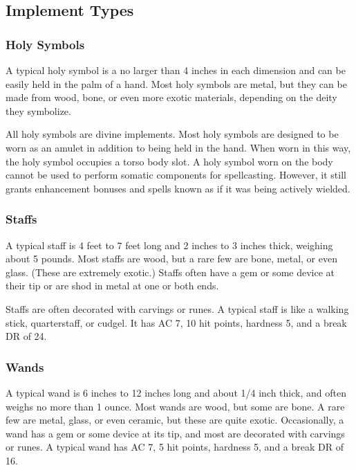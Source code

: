     \subsection{Implement Types}

        \subsubsection{Holy Symbols}

             A typical holy symbol is a no larger than 4 inches in each dimension and can be easily held in the palm of a hand.
            Most holy symbols are metal, but they can be made from wood, bone, or even more exotic materials, depending on the deity they symbolize.

             All holy symbols are divine implements.
            Most holy symbols are designed to be worn as an amulet in addition to being held in the hand.
            When worn in this way, the holy symbol occupies a torso body slot.
            A holy symbol worn on the body cannot be used to perform somatic components for spellcasting.
            However, it still grants enhancement bonuses and spells known as if it was being actively wielded.

        \subsubsection{Staffs}

             A typical staff is 4 feet to 7 feet long and 2 inches to 3 inches thick, weighing about 5 pounds.
            Most staffs are wood, but a rare few are bone, metal, or even glass.
            (These are extremely exotic.)
            Staffs often have a gem or some device at their tip or are shod in metal at one or both ends.

            Staffs are often decorated with carvings or runes.
            A typical staff is like a walking stick, quarterstaff, or cudgel.
            It has AC 7, 10 hit points, hardness 5, and a break DR of 24.

        \subsubsection{Wands}

             A typical wand is 6 inches to 12 inches long and about 1/4 inch thick, and often weighs no more than 1 ounce.
            Most wands are wood, but some are bone.
            A rare few are metal, glass, or even ceramic, but these are quite exotic.
            Occasionally, a wand has a gem or some device at its tip, and most are decorated with carvings or runes.
            A typical wand has AC 7, 5 hit points, hardness 5, and a break DR of 16.

